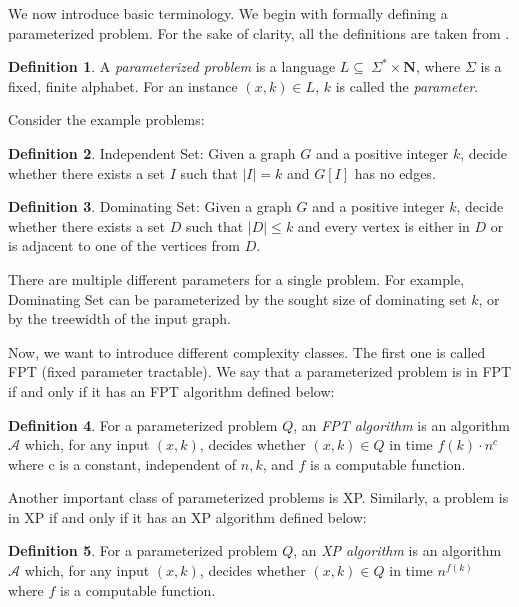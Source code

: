 \documentclass[en]{pracamgr}
\theoremstyle{definition}
\newtheorem{definition}{Definition}
\newcommand{\domsetp}{{\sc Dominating Set}}
\newcommand{\indset}{{\sc Independent Set}}
\begin{document}
We now introduce basic terminology. We begin with formally defining a parameterized problem. For the sake of clarity, all the definitions are taken from \cite{ParAlg}.

\begin{definition}\label{Parameterized problem}
	A \textit{parameterized problem} is a language $L \subseteq \ \Sigma^* \times \mathbf{N}$, where $\Sigma$ is a fixed, finite alphabet. For an instance $(x,k) \in L$, $k$ is called the \textit{parameter}.
\end{definition}

Consider the example problems:

\begin{definition}
	\indset{}: Given a graph $G$ and a positive integer $k$, decide whether there exists a set $I$ such that $|I|=k$ and $G[I]$ has no edges.
\end{definition}

\begin{definition}
	\domsetp{}: Given a graph $G$ and a positive integer $k$, decide whether there exists a set $D$ such that $|D| \leq k$ and every vertex is either in $D$ or is adjacent to one of the vertices from $D$.
\end{definition}

There are multiple different parameters for a single problem. For example, \domsetp{} can be parameterized by the sought size of dominating set $k$, or by the treewidth of the input graph. 

Now, we want to introduce different complexity classes. The first one is called FPT (fixed parameter tractable). We say that a parameterized problem is in FPT if and only if it has an FPT algorithm defined below:

\begin{definition}\label{FPT algorithm}
	For a parameterized problem $Q$, an \textit{FPT algorithm} is an algorithm $\mathcal{A}$ which, for any input $(x,k)$, decides whether $(x,k) \in Q$ in time $f(k)\cdot n^c$ where c is a constant, independent of $n,k$, and $f$ is a computable function.
\end{definition}

Another important class of parameterized problems is XP. Similarly, a problem is in XP if and only if it has an XP algorithm defined below:

\begin{definition}
	For a parameterized problem $Q$, an \textit{XP algorithm} is an algorithm $\mathcal{A}$ which, for any input $(x,k)$, decides whether $(x,k) \in Q$ in time $n^{f(k)}$ where $f$ is a computable function.
\end{definition}
\end{document}
